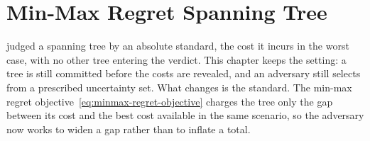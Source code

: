 %

\chapter{Min-Max Regret Spanning Tree}\label{ch:regret}

 judged a spanning tree by an absolute standard, the cost it incurs in the worst case, with no other tree entering the verdict.
This chapter keeps the setting: a tree is still committed before the costs are revealed, and an adversary still selects from a prescribed uncertainty set.
What changes is the standard.
The min-max regret objective~\eqref{eq:minmax-regret-objective} charges the tree only the gap between its cost and the best cost available in the same scenario, so the adversary now works to widen a gap rather than to inflate a total.

